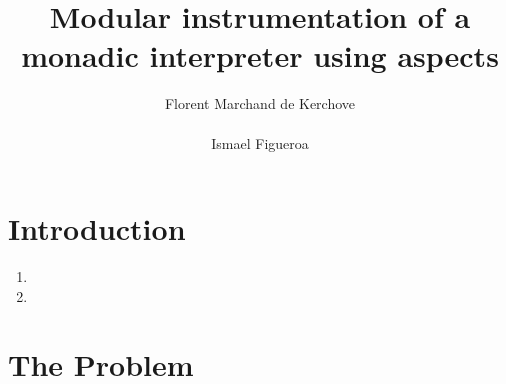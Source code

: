 \documentclass{acm_proc_article-sp}
\begin{document}
\title{Modular instrumentation of a monadic interpreter using aspects}

\author{
%
%
\alignauthor
Florent Marchand de Kerchove\\
       \\
\alignauthor
Ismael Figueroa\\
}

\maketitle
\begin{abstract}
\end{abstract}




\section{Introduction}



\begin{enumerate}
\item
\item
\end{enumerate}

\section{The Problem}
\end{document}
